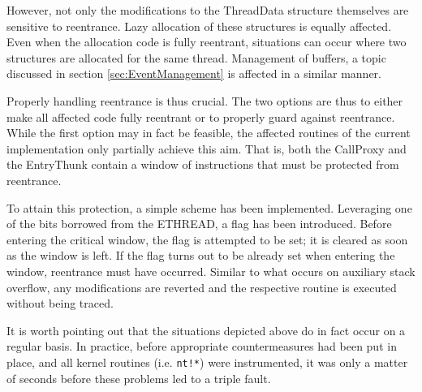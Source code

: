 However, not only the modifications to the ThreadData structure themselves are sensitive
to reentrance. Lazy allocation of these structures is equally affected. Even when
the allocation code is fully reentrant, situations can occur where two structures
are allocated for the same thread. Management of buffers, a topic discussed
in section \ref{sec:EventManagement} is affected in a similar manner.

Properly handling reentrance is thus crucial. The two options are thus to either 
make all affected code fully reentrant or to properly guard against 
reentrance. While the first option may in fact be feasible, the affected 
routines of the current implementation only partially achieve this aim.
That is, both the CallProxy and the EntryThunk contain a window of instructions that
must be protected from reentrance.

To attain this protection, a simple scheme has been implemented. Leveraging one
of the bits borrowed from the ETHREAD, a flag has been introduced. Before
entering the critical window, the flag is attempted to be set; it is cleared as
soon as the window is left. If the flag turns out to be already set when entering
the window, reentrance must have occurred. Similar to what occurs on auxiliary
stack overflow, any modifications are reverted and the respective routine is 
executed without being traced.

It is worth pointing out that the situations depicted above do in fact occur on a
regular basis. In practice, before appropriate countermeasures had been put
in place, and all kernel routines (i.e. \verb|nt!*|) were instrumented, it was only
a matter of seconds before these problems led to a triple fault.

%



